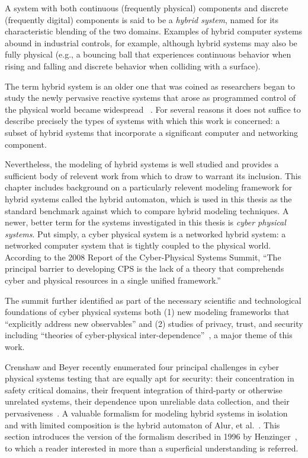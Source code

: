 A system with both continuous (frequently physical) components and discrete (frequently digital)
components is said to be a \emph{hybrid system}, named for its characteristic blending of the
two domains. Examples of hybrid computer systems abound in industrial controls, for example,
although hybrid systems may also be fully physical (e.g., a bouncing ball that experiences continuous
behavior when rising and falling and discrete behavior when colliding with a surface).

The term hybrid system is an older one that was coined as researchers began to study the newly
pervasive reactive systems that arose as programmed control of the physical world became 
widespread ~\cite{alur1993hybrid}. For several reasons it does not suffice to describe precisely
the types of systems with which this work is concerned: a subset of hybrid
systems that incorporate a significant computer and networking component.

Nevertheless, the modeling of hybrid systems is well studied and provides a sufficient body
of relevent work from which to draw to warrant its inclusion. This chapter includes
background on a particularly relevent modeling framework for hybrid systems called the
hybrid automaton, which is used in this thesis as the standard benchmark against which to
compare hybrid modeling techniques.
A newer, better term for the systems investigated in this thesis is \emph{cyber physical systems}.
Put simply, a cyber physical system is a networked hybrid system: a networked computer system that is 
tightly coupled to the physical world. 
According to the 2008 Report of the Cyber-Physical Systems Summit, ``The principal barrier to 
developing CPS is the lack of a theory that comprehends cyber and physical resources in a 
single unified framework.''~\cite{summitreport2008}

The summit further identified as part of the necessary scientific and technological foundations of
cyber physical systems both (1) new modeling frameworks that ``explicitly address new observables'' and (2)
studies of privacy, trust, and security including ``theories of cyber-physical inter-dependence''~\cite{summitreport2008},
a major theme of this work.

Crenshaw and Beyer recently enumerated four principal challenges in cyber physical systems testing that are
equally apt for security:
their concentration in safety critical domains, their frequent integration of third-party or
otherwise unrelated systems, their dependence upon unreliable data collection, and their
pervasiveness~\cite{crenshaw2010upbot}.
A valuable formalism for modeling hybrid systems in isolation and with limited composition
is the hybrid automaton of Alur, et al.~\cite{alur1993hybrid}. This section introduces the
version of the formalism described in 1996 by Henzinger~\cite{henzinger1996theory}, to which a
reader interested in more than a superficial understanding is referred. 

